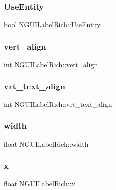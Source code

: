 \subsubsection{\texorpdfstring{Use\+Entity}{UseEntity}}
{\footnotesize\ttfamily bool N\+G\+U\+I\+Label\+Rich\+::\+Use\+Entity}

\hypertarget{class_n_g_u_i_label_rich_ab2722a84446144be20c40fa5ffda3970}{}\label{class_n_g_u_i_label_rich_ab2722a84446144be20c40fa5ffda3970} 
\subsubsection{\texorpdfstring{vert\+\_\+align}{vert\_align}}
{\footnotesize\ttfamily int N\+G\+U\+I\+Label\+Rich\+::vert\+\_\+align}

\hypertarget{class_n_g_u_i_label_rich_a7563c12491eb146c8a89632a426b4224}{}\label{class_n_g_u_i_label_rich_a7563c12491eb146c8a89632a426b4224} 
\subsubsection{\texorpdfstring{vrt\+\_\+text\+\_\+align}{vrt\_text\_align}}
{\footnotesize\ttfamily int N\+G\+U\+I\+Label\+Rich\+::vrt\+\_\+text\+\_\+align}

\hypertarget{class_n_g_u_i_label_rich_aa677317f2a1684467bc56135ed4d70a8}{}\label{class_n_g_u_i_label_rich_aa677317f2a1684467bc56135ed4d70a8} 
\subsubsection{\texorpdfstring{width}{width}}
{\footnotesize\ttfamily float N\+G\+U\+I\+Label\+Rich\+::width}

\hypertarget{class_n_g_u_i_label_rich_aa11d34b45ec1c52b6155878d3fe17425}{}\label{class_n_g_u_i_label_rich_aa11d34b45ec1c52b6155878d3fe17425} 
\subsubsection{\texorpdfstring{x}{x}}
{\footnotesize\ttfamily float N\+G\+U\+I\+Label\+Rich\+::x}

